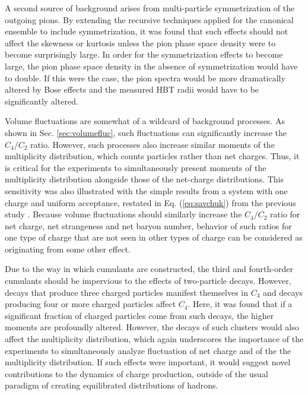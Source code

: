 A second source of background arises from multi-particle symmetrization of the outgoing pions. By extending the recursive techniques applied for the canonical ensemble to include symmetrization, it was found that such effects should not affect the skewness or kurtosis unless the pion phase space density were to become surprisingly large. In order for the symmetrization effects to become large, the pion phase space density in the absence of symmetrization would have to double. If this were the case, the pion spectra would be more dramatically altered by Bose effects and the measured HBT radii would have to be significantly altered. 

Volume fluctuations are somewhat of a wildcard of background processes. As shown in Sec. \ref{sec:volumefluc}, such fluctuations can significantly increase the $C_4/C_2$ ratio. However, such processes also increase similar moments of the multiplicity distribution, which counts particles rather than net charges. Thus, it is critical for the experiments to simultaneously present moments of the multiplicity distribution alongside those of the net-charge distributions. This sensitivity was also illustrated with the simple results from a system with one charge and uniform acceptance, restated in Eq. (\ref{eq:savchuk}) from the previous study \cite{Savchuk:2019xfg}. Because volume fluctuations should similarly increase the $C_4/C_2$ ratio for net charge, net strangeness and net baryon number, behavior of such ratios for one type of charge that are not seen in other types of charge can be considered as originating from some other effect. 

Due to the way in which cumulants are constructed, the third and fourth-order cumulants should be impervious to the effects of two-particle decays. However, decays that produce three charged particles manifest themselves in $C_3$ and decays producing four or more charged particles affect $C_4$. Here, it was found that if a significant fraction of charged particles come from such decays, the higher moments are profoundly altered. However, the decays of such clusters would also affect the multiplicity distribution, which again underscores the importance of the experiments to simultaneously analyze fluctuation of net charge and of the the multiplicity distribution. If such effects were important, it would suggest novel contributions to the dynamics of charge production, outside of the usual paradigm of creating equilibrated distributions of hadrons. 


